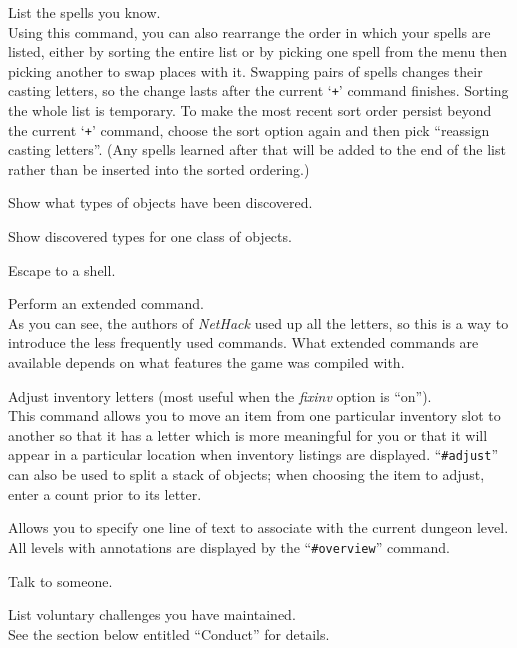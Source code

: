\item[\tb{+}]
List the spells you know.\\
Using this command, you can also rearrange
the order in which your spells are listed, either by sorting the entire
list or by picking one spell from the menu then picking another to swap
places with it.  Swapping pairs of spells changes their casting letters,
so the change lasts after the current `{\tt +}' command finishes.  Sorting
the whole list is temporary.  To make the most recent sort order persist
beyond the current `{\tt +}' command, choose the sort option again and then
pick ``reassign casting letters''.  (Any spells learned after that will
be added to the end of the list rather than be inserted into the sorted
ordering.)
\item[\tb{$\backslash$}]
Show what types of objects have been discovered.
\item[\tb{\`}]
Show discovered types for one class of objects.
\item[\tb{!}]
Escape to a shell.
\item[\tb{\#}]
Perform an extended command.\\
As you can see, the authors of {\it NetHack\/}
used up all the letters, so this is a way to introduce the less frequently
used commands.
What extended commands are available depends on what features
the game was compiled with.
\item[\tb{\#adjust}]
Adjust inventory letters (most useful when the
{\it fixinv\/}
option is ``on'').\\
This command allows you to move an item from one particular inventory
slot to another so that it has a letter which is more meaningful for you
or that it will appear in a particular location when inventory listings
are displayed.
``{\tt \#adjust}'' can also be used to split a stack of objects; when
choosing the item to adjust, enter a count prior to its letter.
\item[\tb{\#annotate}]
Allows you to specify one line of text to associate with the current
dungeon level.  All levels with annotations are displayed by the
``{\tt \#overview}'' command.
\item[\tb{\#chat}]
Talk to someone.
\item[\tb{\#conduct}]
List voluntary challenges you have maintained.\\
See the section below entitled ``Conduct'' for details.
\item[\tb{\#dip}]

